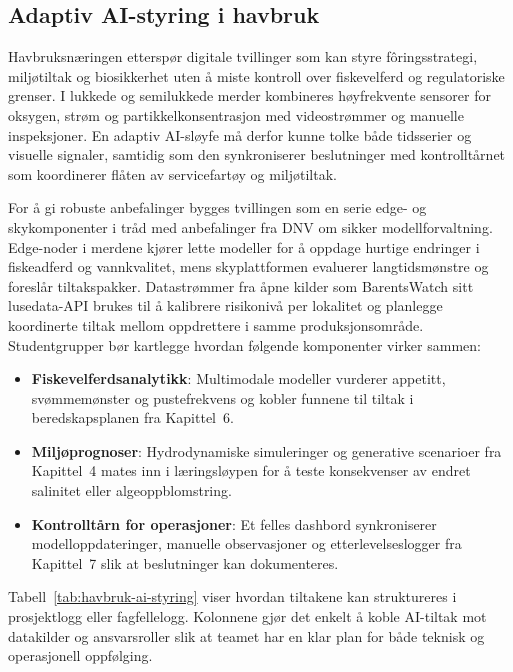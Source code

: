 \subsection{Adaptiv AI-styring i havbruk}
Havbruksnæringen etterspør digitale tvillinger som kan styre fôringsstrategi, miljøtiltak og biosikkerhet uten å miste kontroll over fiskevelferd og regulatoriske grenser.\citep{fore2018precision,nfd2023sjomatmelding} I lukkede og semilukkede merder kombineres høyfrekvente sensorer for oksygen, strøm og partikkelkonsentrasjon med videostrømmer og manuelle inspeksjoner. En adaptiv AI-sløyfe må derfor kunne tolke både tidsserier og visuelle signaler, samtidig som den synkroniserer beslutninger med kontrolltårnet som koordinerer flåten av servicefartøy og miljøtiltak.

For å gi robuste anbefalinger bygges tvillingen som en serie edge- og skykomponenter i tråd med anbefalinger fra DNV om sikker modellforvaltning.\citep{dnv2020rpa204} Edge-noder i merdene kjører lette modeller for å oppdage hurtige endringer i fiskeadferd og vannkvalitet, mens skyplattformen evaluerer langtidsmønstre og foreslår tiltakspakker. Datastrømmer fra åpne kilder som BarentsWatch sitt lusedata-API brukes til å kalibrere risikonivå per lokalitet og planlegge koordinerte tiltak mellom oppdrettere i samme produksjonsområde.\citep{barentswatch2023lusedata} Studentgrupper bør kartlegge hvordan følgende komponenter virker sammen:
\begin{itemize}
    \item \textbf{Fiskevelferdsanalytikk}: Multimodale modeller vurderer appetitt, svømmemønster og pustefrekvens og kobler funnene til tiltak i beredskapsplanen fra Kapittel~6.
    \item \textbf{Miljøprognoser}: Hydrodynamiske simuleringer og generative scenarioer fra Kapittel~4 mates inn i læringsløypen for å teste konsekvenser av endret salinitet eller algeoppblomstring.
    \item \textbf{Kontrolltårn for operasjoner}: Et felles dashbord synkroniserer modelloppdateringer, manuelle observasjoner og etterlevelseslogger fra Kapittel~7 slik at beslutninger kan dokumenteres.
\end{itemize}

Tabell~\ref{tab:havbruk-ai-styring} viser hvordan tiltakene kan struktureres i prosjektlogg eller fagfellelogg. Kolonnene gjør det enkelt å koble AI-tiltak mot datakilder og ansvarsroller slik at teamet har en klar plan for både teknisk og operasjonell oppfølging.

